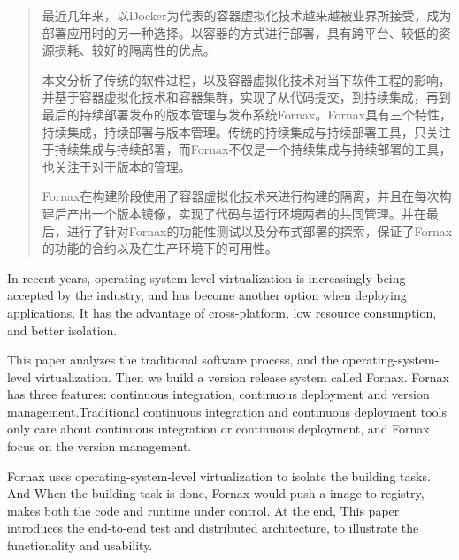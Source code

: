 
\begin{abstract}
\thispagestyle{front}

最近几年来，以Docker为代表的容器虚拟化技术越来越被业界所接受，成为部署应用时的另一种选择。以容器的方式进行部署，具有跨平台、较低的资源损耗、较好的隔离性的优点。

本文分析了传统的软件过程，以及容器虚拟化技术对当下软件工程的影响，并基于容器虚拟化技术和容器集群，实现了从代码提交，到持续集成，再到最后的持续部署发布的版本管理与发布系统Fornax。Fornax具有三个特性，持续集成，持续部署与版本管理。传统的持续集成与持续部署工具，只关注于持续集成与持续部署，而Fornax不仅是一个持续集成与持续部署的工具，也关注于对于版本的管理。

Fornax在构建阶段使用了容器虚拟化技术来进行构建的隔离，并且在每次构建后产出一个版本镜像，实现了代码与运行环境两者的共同管理。并在最后，进行了针对Fornax的功能性测试以及分布式部署的探索，保证了Fornax的功能的合约以及在生产环境下的可用性。

\end{abstract}

\begin{englishabstract}
\thispagestyle{front}

In recent years, operating-system-level virtualization is increasingly being accepted by the industry, and has become another option when deploying applications. It has the advantage of cross-platform, low resource consumption, and better isolation.

This paper analyzes the traditional software process, and the operating-system-level virtualization. Then we build a version release system called Fornax. Fornax has three features: continuous integration, continuous deployment and version management.Traditional continuous integration and continuous deployment tools only care about continuous integration or continuous deployment, and Fornax focus on the version management.

Fornax uses operating-system-level virtualization to isolate the building tasks. And When the building task is done, Fornax would push a image to registry, makes both the code and runtime under control. At the end, This paper introduces the end-to-end test and distributed architecture, to illustrate the functionality and usability.

\end{englishabstract}

